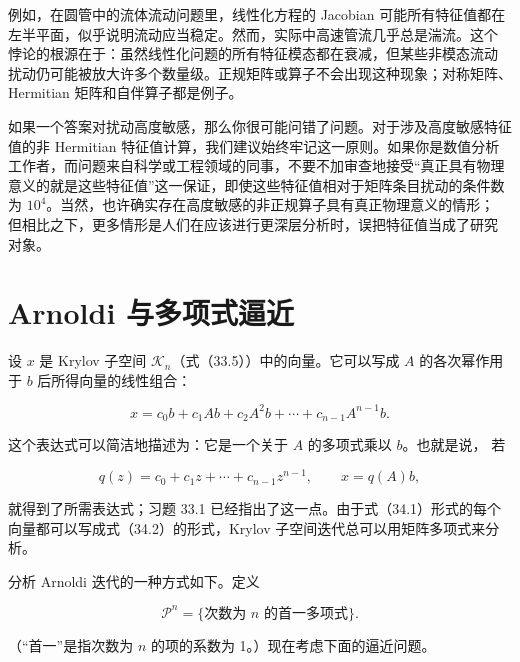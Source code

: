 \documentclass[UTF8,fontset=none,12pt]{ctexart}
\begin{document}
例如，在圆管中的流体流动问题里，线性化方程的 Jacobian 可能所有特征值都在
左半平面，似乎说明流动应当稳定。然而，实际中高速管流几乎总是湍流。这个
悖论的根源在于：虽然线性化问题的所有特征模态都在衰减，但某些非模态流动
扰动仍可能被放大许多个数量级。正规矩阵或算子不会出现这种现象；对称矩阵、
Hermitian 矩阵和自伴算子都是例子。

如果一个答案对扰动高度敏感，那么你很可能问错了问题。对于涉及高度敏感特征
值的非 Hermitian 特征值计算，我们建议始终牢记这一原则。如果你是数值分析
工作者，而问题来自科学或工程领域的同事，不要不加审查地接受“真正具有物理
意义的就是这些特征值”这一保证，即使这些特征值相对于矩阵条目扰动的条件数
为 $10^4$。当然，也许确实存在高度敏感的非正规算子具有真正物理意义的情形；
但相比之下，更多情形是人们在应该进行更深层分析时，误把特征值当成了研究
对象。

\section*{Arnoldi 与多项式逼近}

设 $x$ 是 Krylov 子空间 $\mathcal K_n$（式（33.5））中的向量。它可以写成
$A$ 的各次幂作用于 $b$ 后所得向量的线性组合：

\begin{equation}
x=c_0b+c_1Ab+c_2A^2b+\cdots+c_{n-1}A^{n-1}b.
\tag{34.1}
\end{equation}

这个表达式可以简洁地描述为：它是一个关于 $A$ 的多项式乘以 $b$。也就是说，
若

\begin{equation}
q(z)=c_0+c_1z+\cdots+c_{n-1}z^{n-1},
\qquad x=q(A)b,
\tag{34.2}
\end{equation}

就得到了所需表达式；习题 33.1 已经指出了这一点。由于式（34.1）形式的每个
向量都可以写成式（34.2）的形式，Krylov 子空间迭代总可以用矩阵多项式来分析。

分析 Arnoldi 迭代的一种方式如下。定义

\[
\mathcal P^n=\{\text{次数为 $n$ 的首一多项式}\}.
\]

（“首一”是指次数为 $n$ 的项的系数为 1。）现在考虑下面的逼近问题。

\begin{center}
\end{center}
\end{document}
